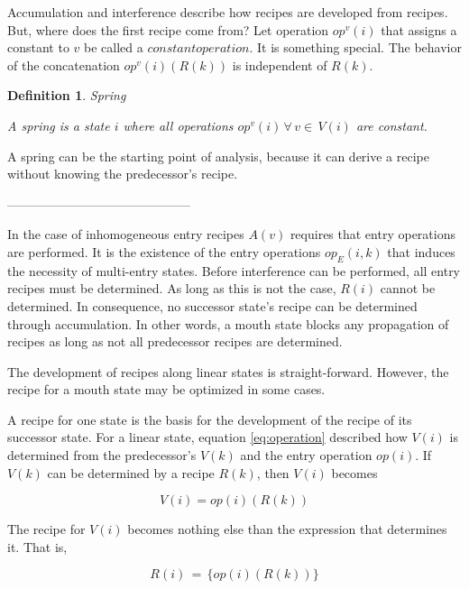 \documentclass[12pt,a4paper]{scrartcl}
\newtheorem{definition}{Definition}
\begin{document}
Accumulation and interference describe how recipes are developed from recipes.
But, where does the first recipe come from?  Let operation $op^v(i)$ that
assigns a constant to $v$ be called a $constant operation$. It is something
special. The behavior of the concatenation $op^v(i)(R(k))$ is independent of
$R(k)$. 
\begin{definition} Spring

    A spring is a state $i$ where all operations $op^v(i)\,\forall\,v\in\,V(i)$
    are constant. 
    
\end{definition}
A spring can be the starting point of analysis, because it can derive a recipe
without knowing the predecessor's recipe. 

--------------------------------------------

In the case of inhomogeneous entry recipes $A(v)$ requires that entry
operations are performed.  It is the existence of the entry operations
$op_E(i,k)$ that induces the necessity of multi-entry states.  Before
interference can be performed, all entry recipes must be determined.  As long
as this is not the case, $R(i)$ cannot be determined. In consequence, no
successor state's recipe can be determined through accumulation. In other
words,  a mouth state blocks any propagation of recipes as long as not all
predecessor recipes are determined. 

The development of recipes along linear states is straight-forward. However,
the recipe for a mouth state may be optimized in some cases. 

A recipe for one state is the basis for the development of the recipe of its
successor state. For a linear state, equation \eqref{eq:operation} described
how $V(i)$ is determined from the predecessor's $V(k)$ and the entry operation
$op(i)$. If $V(k)$ can be determined by a recipe $R(k)$, then $V(i)$ becomes

\begin{equation} \label{eq:accumulation2}
           V(i) = op(i)(R(k))                                     
\end{equation}

The recipe for $V(i)$ becomes nothing else than the expression that determines
it. That is,

\begin{equation} \label{eq:accumulation3}
           R(i)\,=\,\{ op(i)(R(k)) \}                                 
\end{equation}
                 
\end{document}
